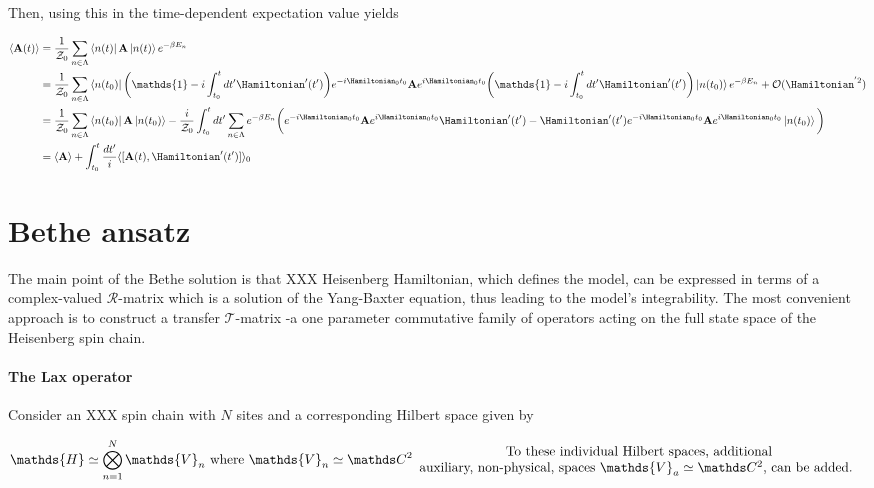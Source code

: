 \documentclass{homework}
\begin{document}
Then, using this in the time-dependent expectation value yields 

\begin{equation} \begin{split}
    \langle {\bf A}(t) \rangle &= \frac{1}{\mathcal{Z}_0} \sum_{n \in \Lambda} \bra{n(t)} {{\bf A}} \ket{n(t)} e^{-\beta E_n} \\
    &= \frac{1}{\mathcal{Z}_0} \sum_{n \in \Lambda} \bra{n(t_0)} \bigg(\mathds{1} - i \int_{t_0}^t dt' \Hamiltonian'(t')\bigg) e^{-i \Hamiltonian_0 t_0} {{\bf A}} e^{i \Hamiltonian_0 t_0} \bigg(\mathds{1} - i \int_{t_0}^t dt' \Hamiltonian'(t')\bigg) \ket{n(t_0)}  e^{-\beta E_n}+ \mathcal{O}(\Hamiltonian^{'2}) \\
    &= \frac{1}{\mathcal{Z}_0} \sum_{n \in \Lambda} \bra{n(t_0)} {{\bf A}} \ket{n(t_0)} - \frac{i}{\mathcal{Z}_0} \int_{t_0}^{t} dt' \sum_{n \in \Lambda} e^{-\beta E_n} \bigg( e^{-i \Hamiltonian_0 t_0} {{\bf A}} e^{i \Hamiltonian_0 t_0} \Hamiltonian'(t') - \Hamiltonian'(t')e^{-i \Hamiltonian_0 t_0} {{\bf A}} e^{i \Hamiltonian_0 t_0} \ket{n(t_0)} \bigg) \\
    &= \langle {{\bf A}} \rangle + \int_{t_0}^{t} \frac{dt'}{i} \langle[{{\bf A}}(t), \Hamiltonian'(t')]\rangle_{0}
\end{split}
\end{equation}

\clearpage

\section{Bethe ansatz}

The main point of the Bethe solution is that XXX Heisenberg Hamiltonian, which defines the model, can be expressed in terms of a complex-valued $\bm{\mathcal R}$-matrix which is a solution of the Yang-Baxter equation, thus leading to the model's integrability. The most convenient approach is to construct a transfer $\bm{\mathcal{T}}$-matrix -a one parameter commutative family of operators acting on the full state space of the Heisenberg spin chain. \\

\paragraph{\textbf{The Lax operator}} Consider an XXX spin chain with $N$ sites and a corresponding Hilbert space given by 

\begin{align}
    \mathds{H} \simeq \bigotimes_{n=1}^{N} {\mathds{V}_n} \textnormal{ where } {\mathds{V}_n} \simeq \ctwo \begin{array}{c}
         \textnormal{To these individual Hilbert spaces, additional}  \\
         \textnormal{auxiliary, non-physical, spaces $\mathds{V}_a \simeq \ctwo$, can be added. } \\
    \end{array}
\end{align}
\end{document}
